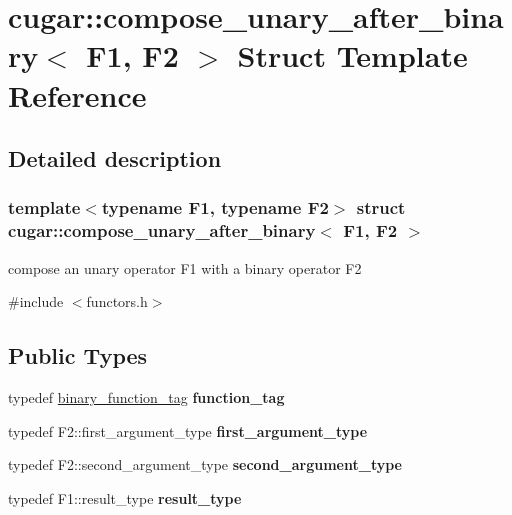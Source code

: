 \hypertarget{structcugar_1_1compose__unary__after__binary}{}\section{cugar\+:\+:compose\+\_\+unary\+\_\+after\+\_\+binary$<$ F1, F2 $>$ Struct Template Reference}
\label{structcugar_1_1compose__unary__after__binary}


\subsection{Detailed description}
\subsubsection*{template$<$typename F1, typename F2$>$\newline
struct cugar\+::compose\+\_\+unary\+\_\+after\+\_\+binary$<$ F1, F2 $>$}

compose an unary operator F1 with a binary operator F2 

{\ttfamily \#include $<$functors.\+h$>$}

\subsection*{Public Types}
\begin{DoxyCompactItemize}
\item 
\mbox{\label{structcugar_1_1compose__unary__after__binary_a8d0706d1f2c568957c7c00e3c3159fc4}} 
typedef \hyperlink{structcugar_1_1binary__function__tag}{binary\+\_\+function\+\_\+tag} {\bfseries function\+\_\+tag}
\item 
\mbox{\label{structcugar_1_1compose__unary__after__binary_acf72b3ef77f11db8d0cf51ba35a1e630}} 
typedef F2\+::first\+\_\+argument\+\_\+type {\bfseries first\+\_\+argument\+\_\+type}
\item 
\mbox{\label{structcugar_1_1compose__unary__after__binary_a4140cb2e0d07217e2f4a9eefc35abe16}} 
typedef F2\+::second\+\_\+argument\+\_\+type {\bfseries second\+\_\+argument\+\_\+type}
\item 
\mbox{\label{structcugar_1_1compose__unary__after__binary_a63ea5dcf820829a87742fa7fa11d06dd}} 
typedef F1\+::result\+\_\+type {\bfseries result\+\_\+type}
\end{DoxyCompactItemize}
